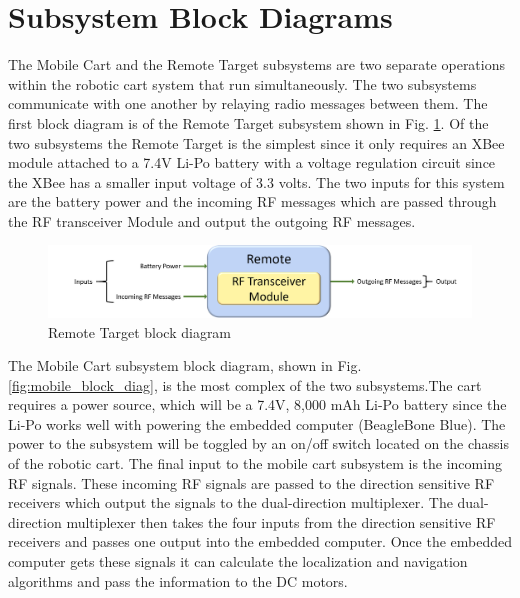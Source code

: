 \section{Subsystem Block Diagrams}
The Mobile Cart and the Remote Target subsystems are two separate operations
within the robotic cart system that run simultaneously. The two subsystems
communicate with one another by relaying radio messages between them. The first
block diagram is of the Remote Target subsystem shown in Fig.
\ref{fig:remote_block_diag}. Of the two subsystems the Remote Target is the
simplest since it only requires an XBee module attached to a 7.4V Li-Po battery
with a voltage regulation circuit since the XBee has a smaller input voltage of
3.3 volts. The two inputs for this system are the battery power and the incoming
RF messages which are passed through the RF transceiver Module and output the
outgoing RF messages.

\begin{figure}[H]
  \centering
  \includegraphics[width=\textwidth]{figs/img/remoteBlockDiagram.png}
  \caption{Remote Target block diagram}
  \label{fig:remote_block_diag}
\end{figure}

\vspace*{12pt}
\noindent
The Mobile Cart subsystem block diagram, shown in Fig.
\ref{fig:mobile_block_diag}, is the most complex of the two subsystems.The cart requires a power source, which will be a 7.4V, 8,000 mAh Li-Po battery since the
Li-Po works well with powering the embedded computer (BeagleBone Blue). The
power to the subsystem will be toggled by an on/off switch located on the
chassis of the robotic cart. The final input to the mobile cart subsystem is the
incoming RF signals. These incoming RF signals are passed to the direction
sensitive RF receivers which output the signals to the dual-direction
multiplexer. The dual-direction multiplexer then takes the four inputs from the
direction sensitive RF receivers and passes one output into the embedded
computer. Once the embedded computer gets these signals it can calculate the
localization and navigation algorithms and pass the information to the DC
motors.

